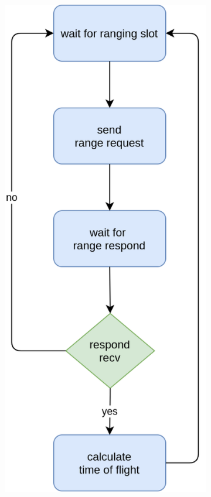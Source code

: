 \documentclass[\main/main.tex]{subfiles}
\begin{document}
\begin{figure}[H]
    \centering
    \begin{subfigure}[b]{0.47\textwidth}
        \begin{center}
            \includegraphics[scale=0.3]{twr_initiator.png}

\end{center}
\end{subfigure}
\end{figure}
\end{document}
